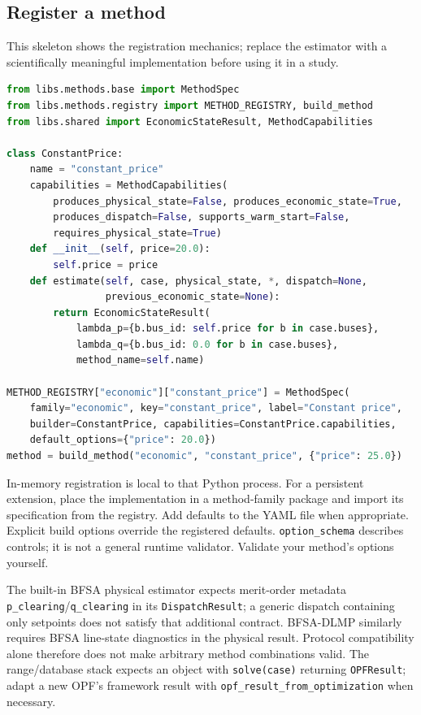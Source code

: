\documentclass[11pt,a4paper]{article}
\newcommand{\code}[1]{\nolinkurl{#1}}
\begin{document}
\subsection{Register a method}
This skeleton shows the registration mechanics; replace the estimator with
a scientifically meaningful implementation before using it in a study.
\begin{lstlisting}[language=Python]
from libs.methods.base import MethodSpec
from libs.methods.registry import METHOD_REGISTRY, build_method
from libs.shared import EconomicStateResult, MethodCapabilities

class ConstantPrice:
    name = "constant_price"
    capabilities = MethodCapabilities(
        produces_physical_state=False, produces_economic_state=True,
        produces_dispatch=False, supports_warm_start=False,
        requires_physical_state=True)
    def __init__(self, price=20.0):
        self.price = price
    def estimate(self, case, physical_state, *, dispatch=None,
                 previous_economic_state=None):
        return EconomicStateResult(
            lambda_p={b.bus_id: self.price for b in case.buses},
            lambda_q={b.bus_id: 0.0 for b in case.buses},
            method_name=self.name)

METHOD_REGISTRY["economic"]["constant_price"] = MethodSpec(
    family="economic", key="constant_price", label="Constant price",
    builder=ConstantPrice, capabilities=ConstantPrice.capabilities,
    default_options={"price": 20.0})
method = build_method("economic", "constant_price", {"price": 25.0})
\end{lstlisting}
In-memory registration is local to that Python process. For a persistent
extension, place the implementation in a method-family package and import
its specification from the registry. Add defaults to the YAML file when
appropriate. Explicit build options override the registered defaults.
\code{option_schema} describes controls; it is not a general runtime validator.
Validate your method's options yourself.

The built-in BFSA physical estimator expects merit-order metadata
\code{p_clearing}/\code{q_clearing} in its \code{DispatchResult}; a generic
dispatch containing only setpoints does not satisfy that additional contract.
BFSA-DLMP similarly requires BFSA line-state diagnostics in the physical
result. Protocol compatibility alone therefore does not make arbitrary
method combinations valid. The range/database stack expects an object with
\code{solve(case)} returning \code{OPFResult}; adapt a new OPF's framework
result with \code{opf_result_from_optimization} when necessary.
\end{document}

